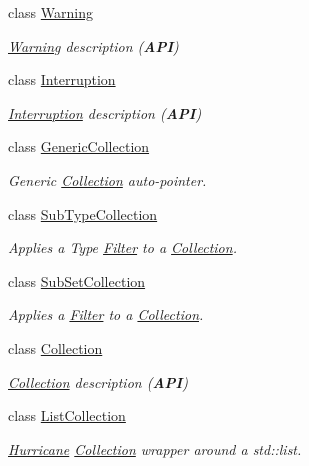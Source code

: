 \begin{DoxyCompactItemize}
class \hyperlink{classHurricane_1_1Warning}{Warning}
\begin{DoxyCompactList}\small\item\em \hyperlink{classHurricane_1_1Warning}{Warning} description ({\bfseries A\-P\-I}) \end{DoxyCompactList}\item 
class \hyperlink{classHurricane_1_1Interruption}{Interruption}
\begin{DoxyCompactList}\small\item\em \hyperlink{classHurricane_1_1Interruption}{Interruption} description ({\bfseries A\-P\-I}) \end{DoxyCompactList}\item 
class \hyperlink{classHurricane_1_1GenericCollection}{Generic\-Collection}
\begin{DoxyCompactList}\small\item\em Generic \hyperlink{classHurricane_1_1Collection}{Collection} auto-\/pointer. \end{DoxyCompactList}\item 
class \hyperlink{classHurricane_1_1SubTypeCollection}{Sub\-Type\-Collection}
\begin{DoxyCompactList}\small\item\em Applies a Type \hyperlink{classHurricane_1_1Filter}{Filter} to a \hyperlink{classHurricane_1_1Collection}{Collection}. \end{DoxyCompactList}\item 
class \hyperlink{classHurricane_1_1SubSetCollection}{Sub\-Set\-Collection}
\begin{DoxyCompactList}\small\item\em Applies a \hyperlink{classHurricane_1_1Filter}{Filter} to a \hyperlink{classHurricane_1_1Collection}{Collection}. \end{DoxyCompactList}\item 
class \hyperlink{classHurricane_1_1Collection}{Collection}
\begin{DoxyCompactList}\small\item\em \hyperlink{classHurricane_1_1Collection}{Collection} description ({\bfseries A\-P\-I}) \end{DoxyCompactList}\item 
class \hyperlink{classHurricane_1_1ListCollection}{List\-Collection}
\begin{DoxyCompactList}\small\item\em \hyperlink{namespaceHurricane}{Hurricane} \hyperlink{classHurricane_1_1Collection}{Collection} wrapper around a std\-::list. \end{DoxyCompactList}\item 

\end{DoxyCompactItemize}
